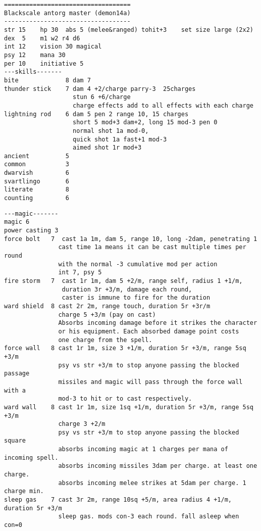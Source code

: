 \begin{samepage}
\begin{verbatim}
\end{verbatim} \pagebreak[1] \begin{verbatim}
===================================
Blackscale antorg master (demon14a)
-----------------------------------
str 15    hp 30  abs 5 (melee&ranged) tohit+3    set size large (2x2)
dex  5    m1 w2 r4 d6
int 12    vision 30 magical
psy 12    mana 30
per 10    initiative 5
---skills-------
bite             8 dam 7
thunder stick    7 dam 4 +2/charge parry-3  25charges
                   stun 6 +6/charge
                   charge effects add to all effects with each charge
lightning rod    6 dam 5 pen 2 range 10, 15 charges
                   short 5 mod+3 dam+2, long 15 mod-3 pen 0
                   normal shot 1a mod-0,
                   quick shot 1a fast+1 mod-3
                   aimed shot 1r mod+3
ancient          5
common           3
dwarvish         6
svartlingo       6
literate         8
counting         6
\end{verbatim} \pagebreak[1] \begin{verbatim}
---magic-------
magic 6
power casting 3
force bolt   7  cast 1a 1m, dam 5, range 10, long -2dam, penetrating 1
               cast time 1a means it can be cast multiple times per round
               with the normal -3 cumulative mod per action
               int 7, psy 5
fire storm   7  cast 1r 1m, dam 5 +2/m, range self, radius 1 +1/m,
                duration 3r +3/m, damage each round,
                caster is immune to fire for the duration
ward shield  8 cast 2r 2m, range touch, duration 5r +3r/m
               charge 5 +3/m (pay on cast)
               Absorbs incoming damage before it strikes the character
               or his equipment. Each absorbed damage point costs
               one charge from the spell.
force wall   8 cast 1r 1m, size 3 +1/m, duration 5r +3/m, range 5sq +3/m
               psy vs str +3/m to stop anyone passing the blocked passage
               missiles and magic will pass through the force wall with a
               mod-3 to hit or to cast respectively.
ward wall    8 cast 1r 1m, size 1sq +1/m, duration 5r +3/m, range 5sq +3/m
               charge 3 +2/m
               psy vs str +3/m to stop anyone passing the blocked square
               absorbs incoming magic at 1 charges per mana of incoming spell.
               absorbs incoming missiles 3dam per charge. at least one charge.
               absorbs incoming melee strikes at 5dam per charge. 1 charge min.
sleep gas    7 cast 3r 2m, range 10sq +5/m, area radius 4 +1/m, duration 5r +3/m
               sleep gas. mods con-3 each round. fall asleep when con=0

\end{verbatim}
\end{samepage}
